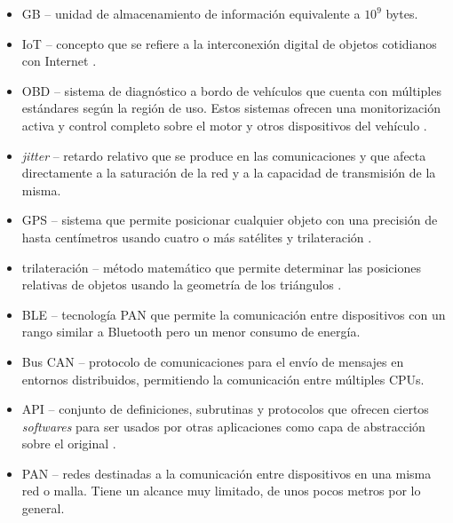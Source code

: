 \begin{acronym}
\end{acronym}

\begin{itemize}
  \item \ac{GB} -- unidad de almacenamiento de información equivalente a $10^9$ bytes.
  \item \ac{IoT} -- concepto que se refiere a la interconexión digital de objetos 
        cotidianos con Internet \cite{InternetCosas2021}.
  \item \ac{OBD} -- sistema de diagnóstico a bordo de vehículos que
        cuenta con múltiples estándares según la región de uso. Estos
        sistemas ofrecen una monitorización activa y control completo
        sobre el motor y otros dispositivos del vehículo \cite{OBD2021}.
  \item \textit{jitter} -- retardo relativo que se produce en las comunicaciones
        y que afecta directamente a la saturación de la red y a la capacidad de
        transmisión de la misma.
  \item \ac{GPS} -- sistema que permite posicionar cualquier objeto con una 
        precisión de hasta centímetros usando cuatro o más satélites y 
        trilateración \cite{GPS2021}.
  \item trilateración -- método matemático que permite determinar las posiciones
        relativas de objetos usando la geometría de los triángulos \cite{Trilateracion2021}.
  \item \ac{BLE} -- tecnología \ac{PAN} que permite la comunicación entre dispositivos
        con un rango similar a Bluetooth pero un menor consumo de energía.
  \item Bus \ac{CAN} -- protocolo de comunicaciones para el envío de
        mensajes en entornos distribuidos, permitiendo la comunicación
        entre múltiples CPUs.
  \item \ac{API} -- conjunto de definiciones, subrutinas y protocolos que ofrecen
        ciertos \textit{softwares} para ser usados por otras aplicaciones como
        capa de abstracción sobre el original \cite{InterfazProgramacionAplicaciones2021}.
  \item \ac{PAN} -- redes destinadas a la comunicación entre dispositivos en una
        misma red o malla. Tiene un alcance muy limitado, de unos pocos metros por
        lo general.
\end{itemize}